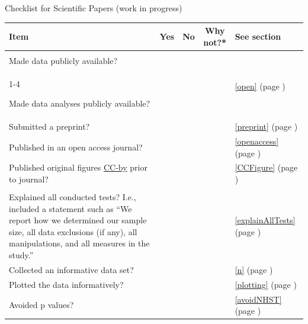 \documentclass[letterpaper,oneside,11pt,article, portrait]{memoir}
\begin{document}
\pagestyle{empty}


\begin{table}[t]

\centering

{\Large Checklist for Scientific Papers (work in progress)}

 \setlength{\extrarowheight}{.2in}
\begin{tabular}{| p{3.5in} | c | c | c | l |}


\hline
\textbf{Item}& \textbf{Yes}& \textbf{No}& \textbf{Why not?*} & \textbf{See section} \\ \hline

\rowcolor[gray]{.9} \multicolumn{5}{| l |}{Openness} \\ \hline

Made data publicly available?	& & & & \multirow{2}{*}{\ref{open} (page \pageref{open})}\\ \cline{1-4}

Made data analyses publicly available? & & & &  \\  \hline

Submitted a preprint?& & & & \ref{preprint} (page \pageref{preprint}) \\ \hline

Published in an open access journal? & & & & \ref{openaccess} (page \pageref{openaccess}) \\ \hline

Published original figures \href{http://creativecommons.org/licenses/by/4.0/}{CC-by} prior to journal? & & & & \ref{CCFigure} (page \pageref{CCFigure}) \\ \hline

\rowcolor[gray]{.9} \multicolumn{5}{| l |}{Statistics} \\ \hline

Explained all conducted tests? I.e., included a statement such as ``We report how we determined our sample size, all data exclusions (if any), all manipulations, and all measures in the study.''	& & & & \ref{explainAllTests} (page \pageref{explainAllTests})  \\ \hline

Collected an informative data set? & & & & \ref{n} (page \pageref{n}) \\ \hline

Plotted the data informatively? & & & & \ref{plotting} (page \pageref{plotting}) \\ \hline

Avoided p values?	& & & & \ref{avoidNHST} (page \pageref{avoidNHST})  \\ \hline


\end{tabular}
\end{table}
\end{document}
